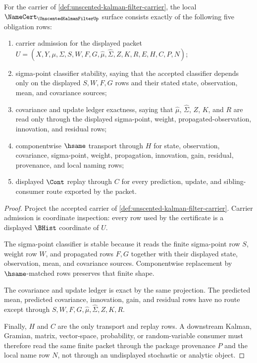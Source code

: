 \begin{theorem}
\label{thm:unscented-kalman-filter-namecert-obligations}
For the carrier of \autoref{def:unscented-kalman-filter-carrier}, the local $\NameCert_{\UnscentedKalmanFilterUp}$ surface consists exactly of the following five obligation rows:
\begin{enumerate}
\item carrier admission for the displayed packet $U=(X,Y,\mu,\Sigma,S,W,F,G,\widehat{\mu},\widehat{\Sigma},Z,K,R,E,H,C,P,N)$;
\item sigma-point classifier stability, saying that the accepted classifier depends only on the displayed $S,W,F,G$ rows and their stated state, observation, mean, and covariance sources;
\item covariance and update ledger exactness, saying that $\widehat{\mu}$, $\widehat{\Sigma}$, $Z$, $K$, and $R$ are read only through the displayed sigma-point, weight, propagated-observation, innovation, and residual rows;
\item componentwise $\hsame$ transport through $H$ for state, observation, covariance, sigma-point, weight, propagation, innovation, gain, residual, provenance, and local naming rows;
\item displayed $\Cont$ replay through $C$ for every prediction, update, and sibling-consumer route exported by the packet.
\end{enumerate}
\end{theorem}
\begin{proof}
Project the accepted carrier of \autoref{def:unscented-kalman-filter-carrier}. Carrier admission is coordinate inspection: every row used by the certificate is a displayed $\BHist$ coordinate of $U$.

The sigma-point classifier is stable because it reads the finite sigma-point row $S$, weight row $W$, and propagated rows $F,G$ together with their displayed state, observation, mean, and covariance sources. Componentwise replacement by $\hsame$-matched rows preserves that finite shape.

The covariance and update ledger is exact by the same projection. The predicted mean, predicted covariance, innovation, gain, and residual rows have no route except through $S,W,F,G,\widehat{\mu},\widehat{\Sigma},Z,K,R$.

Finally, $H$ and $C$ are the only transport and replay rows. A downstream Kalman, Gramian, matrix, vector-space, probability, or random-variable consumer must therefore read the same finite packet through the package provenance $P$ and the local name row $N$, not through an undisplayed stochastic or analytic object.
\end{proof}

